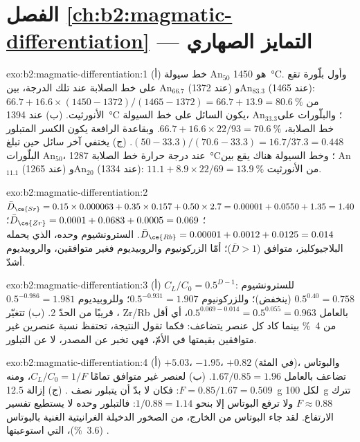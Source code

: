 \section*{الفصل \ref{ch:b2:magmatic-differentiation} --- التمايز الصهاري}

\begin{solution}{exo:b2:magmatic-differentiation:1}
(أ) خط سيولة An$_{50}$ هو \qty{1450}{\celsius}. وأول بلّورة تقع على
خط الصلابة عند تلك الدرجة، بين An$_{66.7}$ (عند 1372) وAn$_{83.3}$ (عند 1465):
$66.7 + 16.6\times(1450 - 1372)/(1465 - 1372) = 66.7 + 13.9 = \qty{80.6}{\percent}$
من الأنورثيت. (ب) عند \qty{1394}{\celsius} يكون السائل على خط السيولة،
An$_{33.3}$؛ والبلّورات على خط الصلابة، $66.7 + 16.6\times22/93 =
\qty{70.6}{\percent}$. وبقاعدة الرافعة يكون الكسر المتبلور $(50 -
33.3)/(70.6 - 33.3) = 16.7/37.3 = 0.448$. (ج) يختفي آخر سائل حين تبلغ
البلّورات An$_{50}$، عند درجة حرارة خط الصلابة \qty{1287}{\celsius}؛
وخط السيولة هناك يقع بين An$_{11.1}$ (عند 1265) وAn$_{20}$ (عند 1334): $11.1 +
8.9\times22/69 = \qty{13.9}{\percent}$ من الأنورثيت.
\end{solution}

\begin{solution}{exo:b2:magmatic-differentiation:2}
$\bar D_{\ce{Sr}} = 0.15\times0.000063 + 0.35\times0.157 + 0.50\times2.7 = 0.00001 +
0.0550 + 1.35 = 1.40$؛ $\bar D_{\ce{Zr}} = 0.0001 + 0.0683 + 0.0005 = 0.069$؛
$\bar D_{\ce{Rb}} = 0.00001 + 0.0012 + 0.0125 = 0.014$. السترونشيوم وحده، الذي يحمله
البلاجيوكليز، متوافق ($\bar D > 1$)؛ أمّا الزركونيوم والروبيديوم فغير متوافقين،
والروبيديوم أشدّ.
\end{solution}

\begin{solution}{exo:b2:magmatic-differentiation:3}
(أ) $C_L/C_0 = 0.5^{D-1}$: للسترونشيوم $0.5^{0.40} = 0.758$ (ينخفض)؛ وللزركونيوم $0.5^{-0.931} =
1.907$؛ وللروبيديوم $0.5^{-0.986} = 1.981$، قريبًا من الحدّ 2. (ب) تتغيّر Zr/Rb بالعامل
$0.5^{0.069 - 0.014} = 0.5^{0.055} = 0.963$، أي أقل من \qty{4}{\percent} بينما كاد كل
عنصر يتضاعف: فكما تقول النتيجة، تحتفظ نسبة عنصرين غير متوافقين
بقيمتها في  الأمّ، فهي تخبر عن المصدر، لا
عن التبلور.
\end{solution}

\begin{solution}{exo:b2:magmatic-differentiation:4}
(أ)  $+5.03$،  $-1.95$،  $+0.82$ (في المئة)، والبوتاس
تضاعف بالعامل $1.67/0.85 = 1.96$. (ب) لعنصر غير متوافق تمامًا
$C_L/C_0 = 1/F$، ومنه $F = 0.85/1.67 = 0.509$: فكان لا بدّ أن يتبلور نصف
. (ج) إزالة \qty{12.5}{g} لكل \qty{100}{g} تترك $F \approx 0.88$
ولا ترفع البوتاس إلا بنحو $1/0.88 = 1.14$: فالتبلور وحده لا يستطيع
تفسير الارتفاع. لقد جاء البوتاس من الخارج، من الصخور الدخيلة الغرانيتية الغنية
بالبوتاس (\qty{3.6}{\percent})، التي استوعبتها .
\end{solution}


